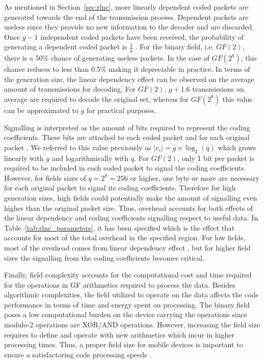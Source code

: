 As mentioned in Section~\ref{sec:rlnc}, more linearly dependent coded packets are generated towards the end of the transmission process. Dependent packets are useless since they provide no new information to the decoder and are discarded. Once $g - 1$ independent coded packets have been received, the probability of generating a dependent coded packet is $\frac{1}{q}$ \cite{lucani2009random,trullols2011exact,zhao2012notes}. For the binary field, i.e. $GF(2)$, there is a 50\% chance of generating useless packets. In the case of $GF(2^8)$, this chance reduces to less than 0.5\% making it depreciable in practice. In terms of the generation size, the linear dependency effect can be observed on the average amount of transmissions for decoding. For $GF(2)$, $g + 1.6$ transmissions on average are required to decode the original set, whereas for $GF(2^8)$ this value can be approximated to $g$ for practical purposes.

Signalling is interpreted as the amount of bits required to represent the coding coefficients. These bits are attached to each coded packet and for each original packet \cite{heide2011code}. We referred to this value previously as $|v_{i}| = g \times \log_{2}(q)$ which grows linearly with $g$ and logarithmically with $q$. For $GF(2)$, only 1 bit per packet is required to be included in each coded packet to signal the coding coefficients. However, for fields sizes of $q = 2^8 = 256$ or higher, one byte or more are necessary for each original packet to signal its coding coefficients. Therefore for high generation sizes, high fields could potentially make the amount of signalling even higher than the original packet size. Thus, overhead accounts for both effects of the linear dependency and coding coefficients signalling respect to useful data. In Table~\ref{tab:rlnc_parameters}, it has been specified which is the effect that accounts for most of the total overhead in the specified region. For low fields, most of the overhead comes from linear dependency effect , but for higher field sizes the signalling from the coding coefficients becomes critical.

Finally, field complexity accounts for the computational cost and time required for the operations in \ac{GF} arithmetics required to process the data. Besides algorithmic complexities, the field utilized to operate on the data affects the code performance in terms of time and energy spent on processing. The binary field poses a low computational burden on the device carrying the operations since modulo-2 operations are XOR/AND operations. However, increasing the field size requires to define and operate with new arithmetics which incur in higher processing times. Thus, a proper field size for mobile devices is important to ensure a satisfactoring code processing speeds \cite{heide2009network,paramanathan2013lean}.

